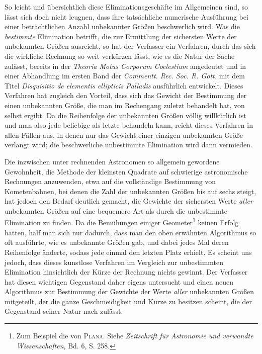 So leicht und übersichtlich diese Eliminationsgeschäfte im Allgemeinen sind, so lässt sich doch nicht leugnen, dass ihre tatsächliche numerische Ausführung bei einer beträchtlichen Anzahl unbekannter Größen beschwerlich wird. Was die \textit{bestimmte} Elimination betrifft, die zur Ermittlung der sichersten Werte der unbekannten Größen ausreicht, so hat der Verfasser ein Verfahren, durch das sich die wirkliche Rechnung so weit verkürzen lässt, wie es die Natur der Sache zulässt, bereits in der \textit{Theoria Motus Corporum Coelestium} angedeutet und in einer Abhandlung im ersten Band der \textit{Commentt. Rec. Soc. R. Gott.} mit dem Titel \textit{Disquisitio de elementis ellipticis Palladis} ausführlich entwickelt. Dieses Verfahren hat zugleich den Vorteil, dass sich das Gewicht der Bestimmung der einen unbekannten Größe, die man im Rechengang zuletzt behandelt hat, von selbst ergibt. Da die Reihenfolge der unbekannten Größen völlig willkürlich ist und man also jede beliebige als letzte behandeln kann, reicht dieses Verfahren in allen Fällen aus, in denen nur das Gewicht einer einzigen unbekannten Größe verlangt wird; die beschwerliche unbestimmte Elimination wird dann vermieden.

Die inzwischen unter rechnenden Astronomen so allgemein gewordene Gewohnheit, die Methode der kleinsten Quadrate auf schwierige astronomische Rechnungen anzuwenden, etwa auf die vollständige Bestimmung von Kometenbahnen, bei denen die Zahl der unbekannten Größen bis auf sechs steigt, hat jedoch den Bedarf deutlich gemacht, die Gewichte der sichersten Werte \textit{aller} unbekannten Größen auf %
eine bequemere Art als durch die unbestimmte Elimination zu finden.
Da die Bemühungen einiger Geometer\footnote{Zum Beispiel die von \textsc{Plana}. Siehe \textit{Zeitschrift für Astronomie und verwandte Wissenschaften}, Bd. 6, S. 258.} keinen Erfolg hatten, half man sich nur dadurch, dass man den oben erwähnten Algorithmus so oft ausführte, wie es unbekannte Größen gab, und dabei jedes Mal deren Reihenfolge änderte, sodass jede einmal den letzten Platz erhielt. Es scheint uns jedoch, dass dieses kunstlose Verfahren im Vergleich zur unbestimmten Elimination hinsichtlich der Kürze der Rechnung nichts gewinnt. Der Verfasser hat diesen wichtigen Gegenstand daher eigens untersucht und einen neuen Algorithmus zur Bestimmung der Gewichte der Werte \textit{aller} unbekannten Größen mitgeteilt, der die ganze Geschmeidigkeit und Kürze zu besitzen scheint, die der Gegenstand seiner Natur nach zulässt.

